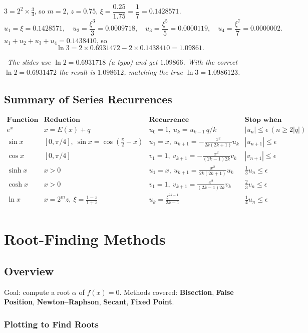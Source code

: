 \documentclass[hidelinks]{article}
\newcommand{\callout}[1]{\par\smallskip\noindent{\color{capri}$\blacktriangleright$}\ \textit{#1}\par\smallskip}
\newcommand{\abs}[1]{\left|#1\right|}
\begin{document}
$3=2^2\times\frac34$, so $m=2$, $z=0.75$, $\xi=\dfrac{0.25}{1.75}=\dfrac17=0.1428571$.
\[
u_1=\xi=0.1428571,\quad u_2=\frac{\xi^3}3=0.0009718,\quad u_3=\frac{\xi^5}5=0.0000119,\quad u_4=\frac{\xi^7}7=0.0000002 .
\]
$u_1+u_2+u_3+u_4=0.1438410$, so
\[
\ln3=2\times0.6931472-2\times0.1438410=1.09861 .
\]
\callout{The slides use $\ln2=0.6931718$ (a typo) and get $1.09866$. With the correct $\ln2=0.6931472$ the result is $1.098612$, matching the true $\ln3=1.0986123$.}

\subsection{Summary of Series Recurrences}

\[
\begin{array}{llll}
\textbf{Function} & \textbf{Reduction} & \textbf{Recurrence} & \textbf{Stop when}\\ \hline
e^x & x=E(x)+q & u_0=1,\ u_k=u_{k-1}\,q/k & \abs{u_n}\le\epsilon\ (n\ge2\abs q)\\
\sin x & [0,\pi/4],\ \sin x=\cos(\tfrac\pi2-x) & u_1=x,\ u_{k+1}=-\frac{x^2}{2k(2k+1)}u_k & \abs{u_{n+1}}\le\epsilon\\
\cos x & [0,\pi/4] & v_1=1,\ v_{k+1}=-\frac{x^2}{(2k-1)2k}v_k & \abs{v_{n+1}}\le\epsilon\\
\sinh x & x>0 & u_1=x,\ u_{k+1}=\frac{x^2}{2k(2k+1)}u_k & \tfrac13u_n\le\epsilon\\
\cosh x & x>0 & v_1=1,\ v_{k+1}=\frac{x^2}{(2k-1)2k}v_k & \tfrac23v_n\le\epsilon\\
\ln x & x=2^mz,\ \xi=\frac{1-z}{1+z} & u_k=\frac{\xi^{2k-1}}{2k-1} & \tfrac14u_n\le\epsilon\\
\end{array}
\]
\section{Root-Finding Methods}\label{sec:roots}

\subsection{Overview}

Goal: compute a root $\alpha$ of $f(x)=0$. Methods covered: \textbf{Bisection}, \textbf{False Position}, \textbf{Newton--Raphson}, \textbf{Secant}, \textbf{Fixed Point}.

\subsubsection{Plotting to Find Roots}
\end{document}
